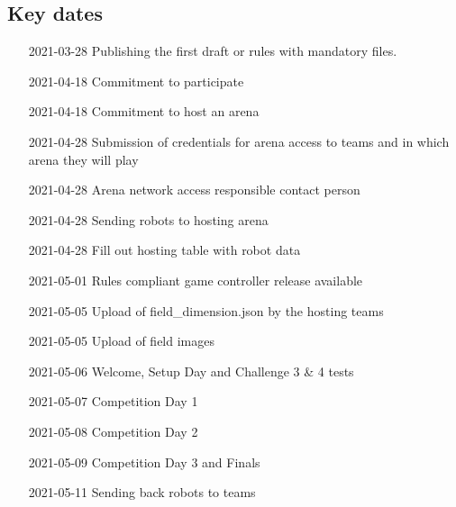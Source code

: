 \subsection{Key dates}

\begin{itemize}[leftmargin=*,labelsep=0.7cm, labelindent=2cm]
    \item [2021-03-28] Publishing the first draft or rules with mandatory files.
    \item [2021-04-18] Commitment to participate
    \item [2021-04-18] Commitment to host an arena
    \item [2021-04-28] Submission of credentials for arena access to teams and in which arena they will play
    \item [2021-04-28] Arena network access responsible contact person
    \item [2021-04-28] Sending robots to hosting arena
    \item [2021-04-28] Fill out hosting table with robot data
    \item [2021-05-01] Rules compliant game controller release available
    \item [2021-05-05] Upload of field\_dimension.json by the hosting teams
    \item [2021-05-05] Upload of field images
    \item [2021-05-06] Welcome, Setup Day and Challenge 3 \& 4 tests
    \item [2021-05-07] Competition Day 1
    \item [2021-05-08] Competition Day 2
    \item [2021-05-09] Competition Day 3 and Finals
    \item [2021-05-11] Sending back robots to teams
\end{itemize}
